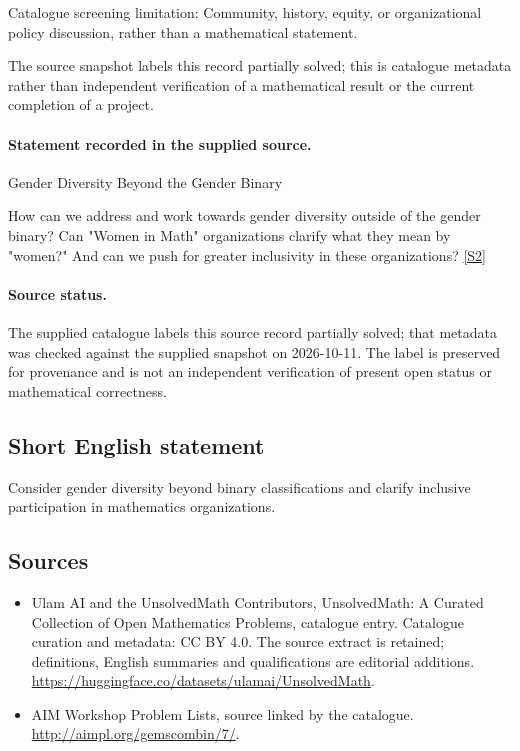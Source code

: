 \documentclass[11pt]{article}
\begin{document}
Catalogue screening limitation: Community, history, equity, or organizational policy discussion, rather than a mathematical statement.

The source snapshot labels this record partially solved; this is catalogue metadata rather than independent verification of a mathematical result or the current completion of a project.
\paragraph{Statement recorded in the supplied source.}
Gender Diversity Beyond the Gender Binary

How can we address and work towards gender diversity outside of the gender binary? Can "Women in Math" organizations clarify what they mean by "women?" And can we push for greater inclusivity in these organizations? \href{http://aimpl.org/gemscombin/7/}{[S2]}
\paragraph{Source status.}
The supplied catalogue labels this source record partially solved; that metadata was checked against the supplied snapshot on 2026-10-11. The label is preserved for provenance and is not an independent verification of present open status or mathematical correctness.
\subsection{Short English statement}
Consider gender diversity beyond binary classifications and clarify inclusive participation in mathematics organizations.
\subsection{Sources}
\begin{itemize}
\item[S1] Ulam AI and the UnsolvedMath Contributors, UnsolvedMath: A Curated Collection of Open Mathematics Problems, catalogue entry. Catalogue curation and metadata: CC BY 4.0. The source extract is retained; definitions, English summaries and qualifications are editorial additions.
\url{https://huggingface.co/datasets/ulamai/UnsolvedMath}.
\item[S2] AIM Workshop Problem Lists, source linked by the catalogue.
\url{http://aimpl.org/gemscombin/7/}.
\end{itemize}
\end{document}
